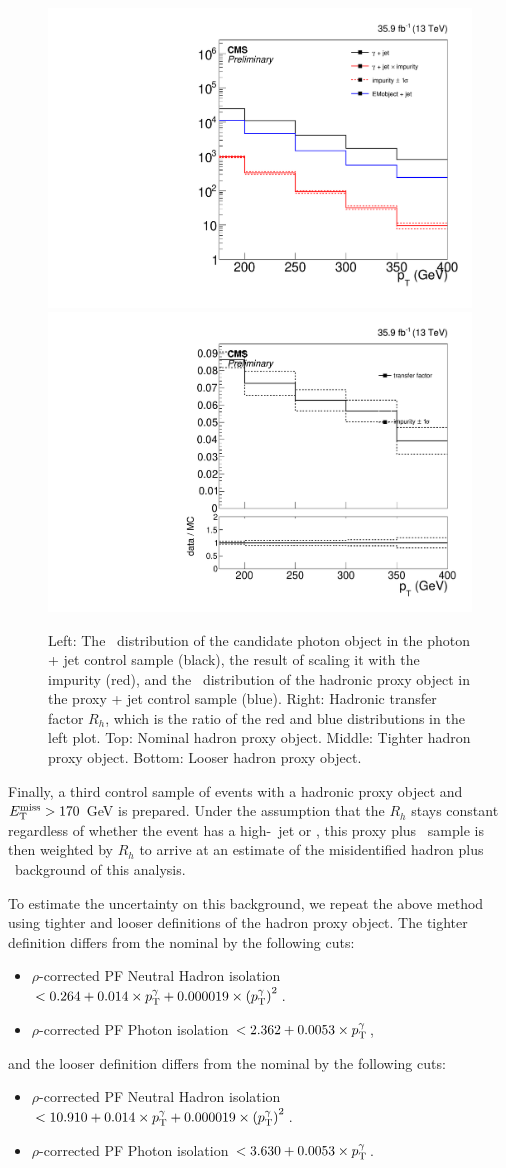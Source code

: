 \begin{figure}[htbp]
\begin{center}
    \includegraphics[width=0.45\linewidth]{Analysis/Figures/hfake/distributionsLoose.pdf}
    \includegraphics[width=0.45\linewidth]{Analysis/Figures/hfake/tfactorLoose.pdf}
    \caption{
      Left: The \pt\ distribution of the candidate photon object in the photon + jet control sample (black), the result of scaling it with the impurity (red), and the \pt\ distribution of the hadronic proxy object in the proxy + jet control sample (blue).
      Right: Hadronic transfer factor $R_{h}$, which is the ratio of the red and blue distributions in the left plot. 
      Top: Nominal hadron proxy object. 
      Middle: Tighter hadron proxy object. 
      Bottom: Looser hadron proxy object.
    }
    \label{fig:hadronTFactor}
  \end{center}
\end{figure}

Finally, a third control sample of events with a hadronic proxy object and $E_{\mathrm{T}}^{\text{miss}} > 170$ GeV is prepared. 
Under the assumption that the $R_{h}$ stays constant regardless of whether the event has a high-\pt\ jet or \met, this proxy plus \met\ sample is then weighted by $R_{h}$ to arrive at an estimate of the misidentified hadron plus \met\ background of this analysis.

To estimate the uncertainty on this background, we repeat the above method using tighter and looser definitions of the hadron proxy object.
The tighter definition differs from the nominal by the following cuts:
\begin{itemize}
\item $\rho$-corrected PF Neutral Hadron isolation $< 0.264 + 0.014 \times p_{\mathrm{T}}^\gamma + 0.000019 \times \left( p_{\mathrm{T}}^\gamma \right)^2$. 
\item $\rho$-corrected PF Photon isolation $< 2.362 + 0.0053 \times p_{\mathrm{T}}^\gamma$,
\end{itemize}
and the looser definition differs from the nominal by the following cuts:
\begin{itemize}
\item $\rho$-corrected PF Neutral Hadron isolation $< 10.910 + 0.014 \times p_{\mathrm{T}}^\gamma + 0.000019 \times \left( p_{\mathrm{T}}^\gamma \right)^2$. 
\item $\rho$-corrected PF Photon isolation $< 3.630 + 0.0053 \times p_{\mathrm{T}}^\gamma$.
\end{itemize}

